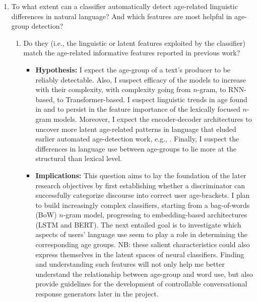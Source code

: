 \begin{enumerate}
    \item To what extent can a classifier automatically detect age-related linguistic differences in natural language? And which features are most helpful in age-group detection?
    \begin{enumerate}
        \item Do they (i.e., the linguistic or latent features exploited by the classifier) match the age-related informative features reported in previous work?
        \begin{itemize}
            \item \textbf{Hypothesis:} I expect the age-group of a text's producer to be reliably detectable. Also, I suspect efficacy of the models to increase with their complexity, with complexity going from $n$-gram, to RNN-based, to Transformer-based. I suspect linguistic trends in age found in \cite{pennebaker2003words} and \cite{schler2006effects} to persist in the feature importance of the lexically focused $n$-gram models. Moreover, I expect the encoder-decoder architectures to uncover more latent age-related patterns in language that eluded earlier automated age-detection work, e.g., \cite{nguyen-etal-2011-author}. Finally, I suspect the differences in language use between age-groups to lie more at the structural than lexical level.
            \item \textbf{Implications:} This question aims to lay the foundation of the later research objectives by first establishing whether a discriminator can successfully categorize discourse into correct user age-brackets. I plan to build increasingly complex classifiers, starting from a bag-of-words (BoW) $n$-gram model, progressing to embedding-based architectures (LSTM and BERT). The next entailed goal is to investigate which aspects of users' language use seem to play a role in determining the corresponding age groups. NB: these salient characteristics could also express themselves in the latent spaces of neural classifiers. Finding and understanding such features will not only help me better understand the relationship between age-group and word use, but also provide guidelines for the development of controllable conversational response generators later in the project.
        \end{itemize}
    \end{enumerate}
    

\end{enumerate}
